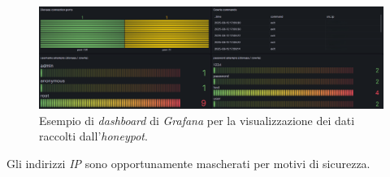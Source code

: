 \begin{figure}[H]
    \begin{center}
    \includegraphics[width=\textwidth]{img/grafana-3.png}
    \caption{Esempio di \textit{dashboard} di \textit{Grafana} per la visualizzazione dei dati raccolti dall'\textit{honeypot}.}
    \label{fig:grafana-3}
    \end{center}
\end{figure}
Gli indirizzi \textit{IP} sono opportunamente mascherati per motivi di sicurezza.
